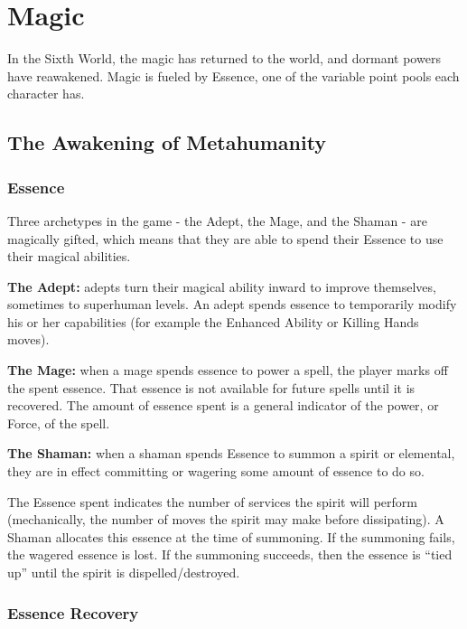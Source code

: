 \chapter{Magic} \label{magic}

In the Sixth World, the magic has returned to the world, and dormant powers have reawakened. Magic is fueled by Essence, one of the variable point pools each character has.



\section{The Awakening of Metahumanity} %

\subsection{Essence}
Three archetypes in the game - the Adept, the Mage, and the Shaman - are magically gifted, which means that they are able to spend their Essence to use their magical abilities.

\textbf{The Adept:} adepts turn their magical ability inward to improve themselves, sometimes to superhuman levels. An adept spends essence to temporarily modify his or her capabilities (for example the Enhanced Ability or Killing Hands moves).

\textbf{The Mage:} when a mage spends essence to power a spell, the player marks off the spent essence. That essence is not available for future spells until it is recovered. The amount of essence spent is a general indicator of the power, or Force, of the spell.

\textbf{The Shaman:} when a shaman spends Essence to summon a spirit or elemental, they are in effect committing or wagering some amount of essence to do so.

The Essence spent indicates the number of services the spirit will perform (mechanically, the number of moves the spirit may make before dissipating). A Shaman allocates this essence at the time of summoning. If the summoning fails, the wagered essence is lost. If the summoning succeeds, then the essence is “tied up” until the spirit is dispelled/destroyed.


\subsection{Essence Recovery}

